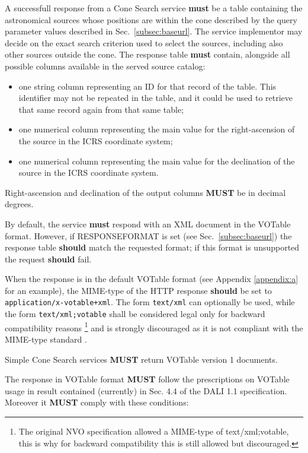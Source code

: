\documentclass[11pt,a4paper]{ivoa}
\begin{document}
A successfull response from a Cone Search service \textbf{must} be a
table containing the astronomical sources whose positions are within the
cone described by the query parameter values described in
Sec.~\ref{subsec:baseurl}. The service implementor may decide on the exact
search criterion used to select the sources, including also other
sources outside the cone.
The response table \textbf{must} contain, alongside all possible columns
available in the served source catalog:
\begin{itemize}
	\item one string column representing an ID for that record of the table.
		This identifier may not be repeated in the table, and it could be used to
		retrieve that same record again from that same table;
	\item one numerical column representing the main value for the
		right-ascension of the source in the ICRS coordinate system;
	\item one numerical column representing the main value for the
		declination of the source in the ICRS coordinate system.
\end{itemize}
Right-ascension and declination of the output columns \textbf{MUST} be in decimal degrees.

By default, the service \textbf{must} respond with an XML document in the
VOTable\citep{2025ivoa.spec.0116O} format. However, if RESPONSEFORMAT is
set (see Sec.~\ref{subsec:baseurl}) the response table \textbf{should}
match the requested format; if this format is unsupported the request
\textbf{should} fail.

When the response is in the default VOTable format (see Appendix \ref{appendix:a}
for an example), the MIME-type of the HTTP response \textbf{should} be
set to \texttt{application/x-votable+xml}. The form
\texttt{text/xml} can optionally be used, while the
form \texttt{text/xml;votable} shall be considered legal
only for backward compatibility reasons
\footnote{
	The original NVO specification allowed a MIME-type of text/xml;votable,
	this is why for backward compatibility this is still allowed but discouraged.
}
and is strongly discouraged as it is not compliant with the MIME-type
standard \citep{std:MIME}. 

Simple Cone Search services \textbf{MUST} return VOTable
version 1 documents.

The response in VOTable format \textbf{MUST} follow the prescriptions on
VOTable usage in result contained (currently) in Sec. 4.4 of the DALI 1.1
specification. Moreover it \textbf{MUST} comply with these conditions:
\end{document}
